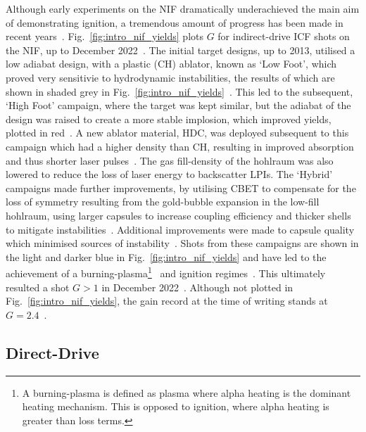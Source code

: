 Although early experiments on the \ac{NIF} dramatically underachieved the main aim of demonstrating ignition, a tremendous amount of progress has been made in recent years~\cite{hurricane_physics_2023}.
Fig.~\ref{fig:intro_nif_yields} plots $G$ for indirect-drive \ac{ICF} shots on the \ac{NIF}, up to December 2022~\cite{abu-shawareb_achievement_2024}.
The initial target designs, up to 2013, utilised a low adiabat design, with a plastic (CH) ablator, known as `Low Foot', which proved very sensitivie to hydrodynamic instabilities, the results of which are shown in shaded grey in Fig.~\ref{fig:intro_nif_yields}~\cite{lindl_review_2014}.
This led to the subsequent, `High Foot' campaign, where the target was kept similar, but the adiabat of the design was raised to create a more stable implosion, which improved yields, plotted in red~\cite{hurricane_high-foot_2014}.
A new ablator material, \ac{HDC}, was deployed subsequent to this campaign which had a higher density than CH, resulting in improved absorption and thus shorter laser pulses~\cite{mackinnon_high-density_2014}.
The gas fill-density of the hohlraum was also lowered to reduce the loss of laser energy to backscatter \ac{LPIs}.
The `Hybrid' campaigns made further improvements, by utilising \ac{CBET} to compensate for the loss of symmetry resulting from the gold-bubble expansion in the low-fill hohlraum, using larger capsules to increase coupling efficiency and thicker shells to mitigate instabilities~\cite{zylstra_record_2021}.
Additional improvements were made to capsule quality which minimised sources of instability~\cite{kritcher_design_2024}.
Shots from these campaigns are shown in the light and darker blue in Fig.~\ref{fig:intro_nif_yields} and have led to the achievement of a burning-plasma\footnote{A burning-plasma is defined as plasma where alpha heating is the dominant heating mechanism. This is opposed to ignition, where alpha heating is greater than loss terms.}~\cite{zylstra_burning_2022,kritcher_design_2022} and ignition regimes~\cite{abu-shawareb_lawson_2022}.
This ultimately resulted a shot $G>1$ in December 2022~\cite{abu-shawareb_achievement_2024}.
Although not plotted in Fig.~\ref{fig:intro_nif_yields}, the gain record at the time of writing stands at $G=2.4$~\cite{noauthor_nif_nodate}.

\subsection{Direct-Drive}%
\label{sec:intro_direct}

